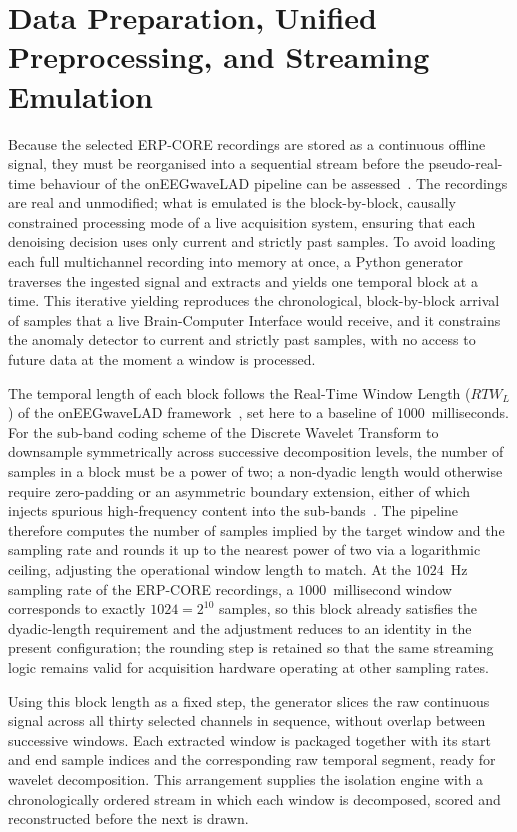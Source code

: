\documentclass[MScCS,12pt,oneside,final]{uccthesis}
\begin{document}
\section{Data Preparation, Unified Preprocessing, and Streaming Emulation}
\label{sec:data_prep_streaming}

Because the selected ERP-CORE recordings are stored as a continuous offline signal, they must be reorganised into a sequential stream before the pseudo-real-time behaviour of the onEEGwaveLAD pipeline can be assessed~\parencite{longo2025oneegwavelad}. The recordings are real and unmodified; what is emulated is the block-by-block, causally constrained processing mode of a live acquisition system, ensuring that each denoising decision uses only current and strictly past samples. To avoid loading each full multichannel recording into memory at once, a Python generator traverses the ingested signal and extracts and yields one temporal block at a time. This iterative yielding reproduces the chronological, block-by-block arrival of samples that a live Brain-Computer Interface would receive, and it constrains the anomaly detector to current and strictly past samples, with no access to future data at the moment a window is processed.

The temporal length of each block follows the Real-Time Window Length ($RTW_L$) of the onEEGwaveLAD framework~\parencite{longo2025oneegwavelad}, set here to a baseline of $1000$~milliseconds. For the sub-band coding scheme of the Discrete Wavelet Transform to downsample symmetrically across successive decomposition levels, the number of samples in a block must be a power of two; a non-dyadic length would otherwise require zero-padding or an asymmetric boundary extension, either of which injects spurious high-frequency content into the sub-bands~\parencite{mallat1989theory}. The pipeline therefore computes the number of samples implied by the target window and the sampling rate and rounds it up to the nearest power of two via a logarithmic ceiling, adjusting the operational window length to match. At the $1024$~Hz sampling rate of the ERP-CORE recordings, a $1000$~millisecond window corresponds to exactly $1024 = 2^{10}$ samples, so this block already satisfies the dyadic-length requirement and the adjustment reduces to an identity in the present configuration; the rounding step is retained so that the same streaming logic remains valid for acquisition hardware operating at other
sampling rates.

Using this block length as a fixed step, the generator slices the raw continuous signal across all thirty selected channels in sequence, without overlap between successive windows. Each extracted window is packaged together with its start and end sample indices and the corresponding raw temporal segment, ready for wavelet decomposition. This arrangement supplies the isolation engine with a chronologically ordered stream in which each window is decomposed, scored and reconstructed before the next is drawn.
\end{document}
